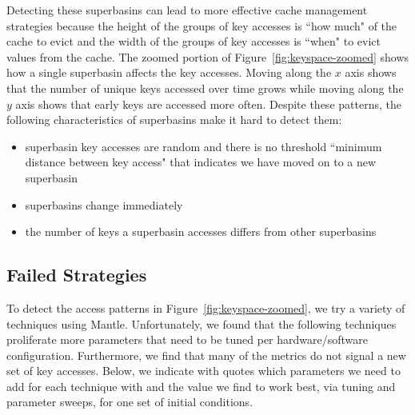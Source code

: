 Detecting these superbasins can lead to more effective cache management
strategies because the height of the groups of key accesses is ``how much" of
the cache to evict and the width of the groups of key accesses is ``when" to
evict values from the cache.  The zoomed portion of
Figure~\ref{fig:keyspace-zoomed} shows how a single superbasin affects the key
accesses. Moving along the \(x\) axis shows that the number of unique keys
accessed over time grows while moving along the \(y\) axis shows that early
keys are accessed more often.  Despite these patterns, the following
characteristics of superbasins make it hard to detect them:

\begin{itemize}

  \item superbasin key accesses are random and there is no threshold ``minimum distance
  between key access" that indicates we have moved on to a new superbasin

  \item superbasins change immediately

  \item the number of keys a superbasin accesses differs from other superbasins

\end{itemize}

\subsection{Failed Strategies}

To detect the access patterns in Figure~\ref{fig:keyspace-zoomed}, we try a
variety of techniques using Mantle. Unfortunately, we found that the following
techniques proliferate more parameters that need to be tuned per
hardware/software configuration. Furthermore, we find that many of the metrics
do not signal a new set of key accesses.  Below, we indicate with quotes which
parameters we need to add for each technique with and the value we find to work
best, via tuning and parameter sweeps, for one set of initial conditions.

